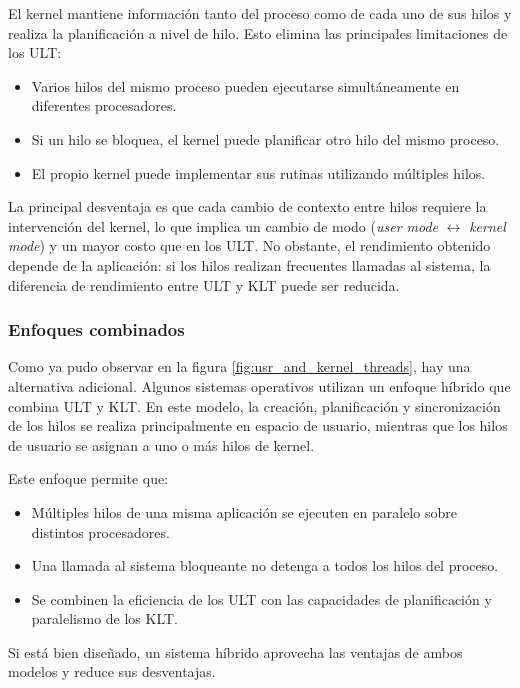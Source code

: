 El kernel mantiene información tanto del proceso como de cada uno de sus hilos y realiza la planificación a nivel de hilo. Esto elimina las principales limitaciones de los ULT:
\begin{itemize}
  \item Varios hilos del mismo proceso pueden ejecutarse simultáneamente en diferentes procesadores.
  \item Si un hilo se bloquea, el kernel puede planificar otro hilo del mismo proceso.
  \item El propio kernel puede implementar sus rutinas utilizando múltiples hilos.
\end{itemize}
La principal desventaja es que cada cambio de contexto entre hilos requiere la intervención del kernel, lo que implica un cambio de modo (\textit{user mode} $\leftrightarrow$ \textit{kernel mode}) y un mayor costo que en los ULT. No obstante, el rendimiento obtenido depende de la aplicación: si los hilos realizan frecuentes llamadas al sistema, la diferencia de rendimiento entre ULT y KLT puede ser reducida.

\subsubsection{Enfoques combinados}

Como ya pudo observar en la figura \ref{fig:usr_and_kernel_threads}, hay una alternativa adicional. Algunos sistemas operativos utilizan un enfoque híbrido que combina ULT y KLT. En este modelo, la creación, planificación y sincronización de los hilos se realiza principalmente en espacio de usuario, mientras que los hilos de usuario se asignan a uno o más hilos de kernel.

Este enfoque permite que:
\begin{itemize}
  \item Múltiples hilos de una misma aplicación se ejecuten en paralelo sobre distintos procesadores.
  \item Una llamada al sistema bloqueante no detenga a todos los hilos del proceso.
  \item Se combinen la eficiencia de los ULT con las capacidades de planificación y paralelismo de los KLT.
\end{itemize}
Si está bien diseñado, un sistema híbrido aprovecha las ventajas de ambos modelos y reduce sus desventajas.
